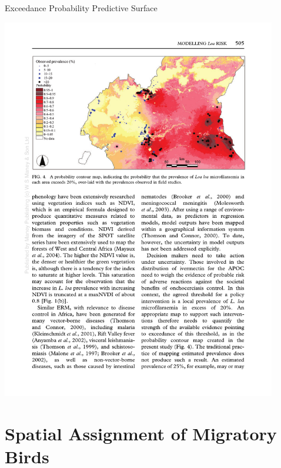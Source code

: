 \documentclass[11pt,ignorenonframetext,]{beamer}
\begin{document}
\begin{frame}{Exceedance Probability Predictive Surface}

\begin{center}
\includegraphics[width=0.9\textwidth]{figs/diggle_fig4.pdf}
\end{center}

\end{frame}

\section{Spatial Assignment of Migratory
Birds}\label{spatial-assignment-of-migratory-birds}
\end{document}
